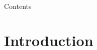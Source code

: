 \documentclass[8pt]{beamer}
\begin{document}
\begin{frame}
\begin{block}{}
\titlepage
\end{block}
\end{frame}

\begin{frame}
\begin{block}{Contents}
\tableofcontents
\end{block}

\end{frame}
\section{Introduction}
\end{document}

